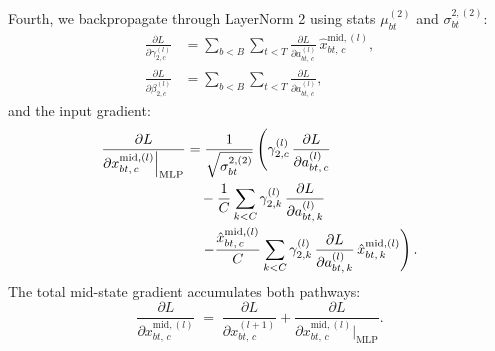 \documentclass[letterpaper, 10 pt, conference]{ieeeconf}
\newcommand{\pdv}[2]{\frac{\partial #1}{\partial #2}}
\newcommand{\dL}[1]{\pdv{L}{#1}}
\theoremstyle{definition}
\begin{document}
Fourth, we backpropagate through LayerNorm 2 using stats $\mu^{(2)}_{bt}$ and $\sigma^{2, (2)}_{bt}$:
\begin{align}
  \dL{\gamma^{(l)}_{2, c}}
   & = \sum_{b<B} \sum_{t<T} \dL{a^{(l)}_{bt,\, c}}\,\hat{x}^{\text{mid}, (l)}_{bt,\, c},
  \label{eq:full-dgamma2}                                                                 \\
  \dL{\beta^{(l)}_{2, c}}
   & = \sum_{b<B} \sum_{t<T} \dL{a^{(l)}_{bt,\, c}},
  \label{eq:full-dbeta2}
\end{align}
and the input gradient:
\begin{align}
  \dL{x^{\text{mid}, (l)}_{bt,\, c}\Big|_{\text{MLP}}}
   & = \frac{1}{\sqrt{\sigma^{2, (2)}_{bt}}} \left( \gamma^{(l)}_{2, c}\,\dL{a^{(l)}_{bt,\, c}} \right. \notag                                                         \\
   & \quad - \frac{1}{C} \sum_{k<C} \gamma^{(l)}_{2, k}\,\dL{a^{(l)}_{bt,\, k}} \notag                                                                                 \\
   & \quad \left. - \frac{\hat{x}^{\text{mid}, (l)}_{bt,\, c}}{C} \sum_{k<C} \gamma^{(l)}_{2, k}\,\dL{a^{(l)}_{bt,\, k}}\,\hat{x}^{\text{mid}, (l)}_{bt,\, k} \right).
  \label{eq:full-dxmid-mlp}
\end{align}
The total mid-state gradient accumulates both pathways:
\begin{equation}
  \dL{x^{\text{mid}, (l)}_{bt,\, c}} \;=\; \dL{x^{(l+1)}_{bt,\, c}} + \dL{x^{\text{mid}, (l)}_{bt,\, c}\Big|_{\text{MLP}}}.
  \label{eq:full-dxmid}
\end{equation}
\end{document}

